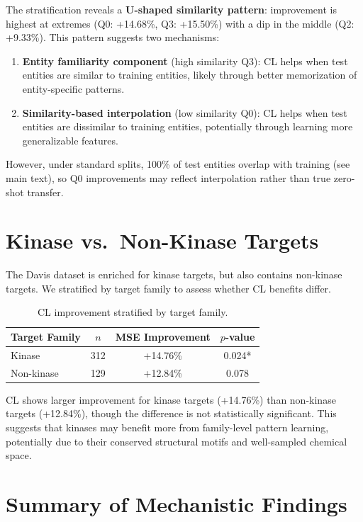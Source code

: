\documentclass[10pt,a4paper]{article}
\begin{document}
The stratification reveals a \textbf{U-shaped similarity pattern}: improvement is highest at extremes (Q0: +14.68\%, Q3: +15.50\%) with a dip in the middle (Q2: +9.33\%). This pattern suggests two mechanisms:
\begin{enumerate}
\item \textbf{Entity familiarity component} (high similarity Q3): CL helps when test entities are similar to training entities, likely through better memorization of entity-specific patterns.
\item \textbf{Similarity-based interpolation} (low similarity Q0): CL helps when test entities are dissimilar to training entities, potentially through learning more generalizable features.
\end{enumerate}

However, under standard splits, 100\% of test entities overlap with training (see main text), so Q0 improvements may reflect interpolation rather than true zero-shot transfer.

\section{Kinase vs.\ Non-Kinase Targets}

The Davis dataset is enriched for kinase targets, but also contains non-kinase targets. We stratified by target family to assess whether CL benefits differ.

\begin{table}[!h]
\caption{CL improvement stratified by target family.}
\label{tab:stratification_family}
\centering
\begin{tabular}{lccc}
\toprule
Target Family & $n$ & MSE Improvement & $p$-value \\
\midrule
Kinase & 312 & +14.76\% & 0.024* \\
Non-kinase & 129 & +12.84\% & 0.078 \\
\bottomrule
\end{tabular}
\end{table}

CL shows larger improvement for kinase targets (+14.76\%) than non-kinase targets (+12.84\%), though the difference is not statistically significant. This suggests that kinases may benefit more from family-level pattern learning, potentially due to their conserved structural motifs and well-sampled chemical space.

\section{Summary of Mechanistic Findings}
\end{document}
